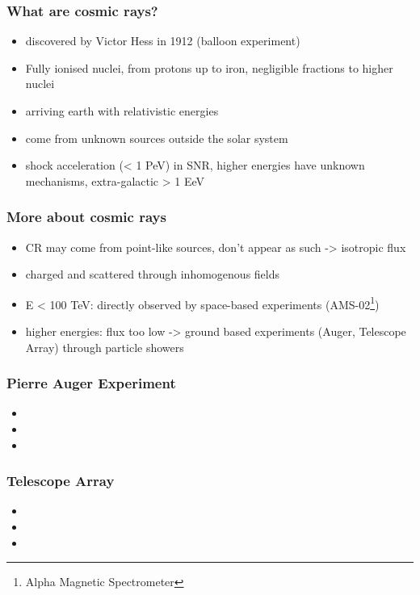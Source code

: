 \documentclass[aspectratio=1610, 9pt]{beamer}
\begin{document}
\begin{frame}\frametitle{What are cosmic rays?}
  \begin{itemize}
    \item discovered by Victor Hess in 1912 (balloon experiment)
    \item Fully ionised nuclei, from protons up to iron, negligible fractions
    to higher nuclei
    \item arriving earth with relativistic energies
    \item come from unknown sources outside the solar system
    \item shock acceleration (< 1 PeV) in SNR, higher energies have unknown
    mechanisms, extra-galactic > 1 EeV
  \end{itemize}
\end{frame}

\begin{frame}\frametitle{More about cosmic rays}
  \begin{itemize}
    \item CR may come from point-like sources, don't appear as such -> isotropic flux
    \item charged and scattered through inhomogenous fields
    \item E < 100 TeV: directly observed by space-based experiments (AMS-02\footnote{Alpha Magnetic Spectrometer})
    \item higher energies: flux too low -> ground based experiments
    (Auger, Telescope Array) through particle showers
  \end{itemize}
\end{frame}

\begin{frame}\frametitle{Pierre Auger Experiment}
  \begin{itemize}
    \item
    \item
    \item
  \end{itemize}
\end{frame}

\begin{frame}\frametitle{Telescope Array}
  \begin{itemize}
    \item
    \item
    \item
  \end{itemize}
\end{frame}
\end{document}
